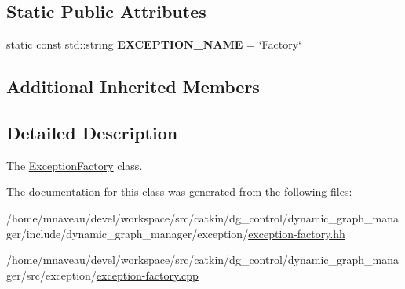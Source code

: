 \subsection*{Static Public Attributes}
\begin{DoxyCompactItemize}
\item 
static const std\+::string {\bfseries E\+X\+C\+E\+P\+T\+I\+O\+N\+\_\+\+N\+A\+ME} = \char`\"{}Factory\char`\"{}\hypertarget{classdynamic__graph_1_1ExceptionFactory_a7fe66d9197d860bd55f3a9676fa489b1}{}\label{classdynamic__graph_1_1ExceptionFactory_a7fe66d9197d860bd55f3a9676fa489b1}

\end{DoxyCompactItemize}
\subsection*{Additional Inherited Members}


\subsection{Detailed Description}
The \hyperlink{classdynamic__graph_1_1ExceptionFactory}{Exception\+Factory} class. 

The documentation for this class was generated from the following files\+:\begin{DoxyCompactItemize}
\item 
/home/mnaveau/devel/workspace/src/catkin/dg\+\_\+control/dynamic\+\_\+graph\+\_\+manager/include/dynamic\+\_\+graph\+\_\+manager/exception/\hyperlink{exception-factory_8hh}{exception-\/factory.\+hh}\item 
/home/mnaveau/devel/workspace/src/catkin/dg\+\_\+control/dynamic\+\_\+graph\+\_\+manager/src/exception/\hyperlink{exception-factory_8cpp}{exception-\/factory.\+cpp}\end{DoxyCompactItemize}
